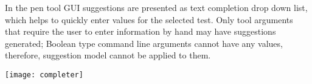 In the pen tool GUI suggestions are presented as text completion drop down list, which helps to quickly enter values for the selected test. Only tool arguments that require the user to enter information by hand may have suggestions generated; Boolean type command line arguments cannot have any values, therefore, suggestion model cannot be applied to them. 

\begin{center}
	\begin{sideways}%
		\begin{minipage}{\textheight}
			\texttt{[image: completer]}
			\label{fig:completer}
		\end{minipage}
	\end{sideways}
\end{center}


